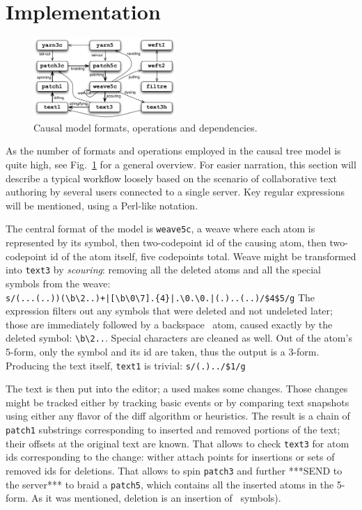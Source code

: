 \documentclass{acm_proc_article-sp}
\begin{document}
\section{Implementation}	   \label{sec:algos}

\begin{figure} \label{fig:ops}
\includegraphics[width=0.48\textwidth]{operations.pdf}
\caption{Causal model formats, operations and dependencies.}
\end{figure}

As the number of formats and operations employed in the
causal tree model is quite high, see Fig.~\ref{fig:ops}
for a general overview.
For easier narration, this section will describe a
typical workflow loosely based on the scenario of 
collaborative text authoring by several users connected
to a single server. Key regular expressions will be
mentioned, using a Perl-like notation.

The central format of the model is {\tt weave5c}, a weave
where each atom is represented by its symbol, then
two-codepoint id of the causing atom, then two-codepoint
id of the atom itself, five codepoints total.
Weave might be transformed into {\tt text3} by 
\emph{scouring}: removing all the deleted atoms and all
the special symbols from the weave: \\
{\small \verb`s/(...(..))(\b\2..)+|[\b\0\7].{4}|.\0.\0.|(.)..(..)/$4$5/g`}
The expression filters out any symbols that were deleted
and not undeleted later; those are immediately followed
by a backspace \bsp ~atom, caused
exactly by the deleted symbol: {\tt \verb+\b\2..+}.
Special characters are cleaned as well.
Out of the atom's 5-form, only the symbol and its id are
taken, thus the output is a 3-form.
Producing the text itself, {\tt text1} is trivial:
{\small \verb`s/(.)../$1/g`}

The text is then put into the editor; a used makes some
changes. Those changes might be tracked either by tracking
basic events or by comparing text snapshots using either
any flavor of the diff algorithm or heuristics.
The result is a chain of {\tt patch1} substrings
corresponding to inserted and removed portions of the text;
their offsets at the original text are known. That allows
to check {\tt text3} for atom ids corresponding to the
change: wither attach points for insertions or sets of
removed ids for deletions. That allows to spin {\tt patch3}
and further ***SEND to the server***
 to braid a {\tt patch5}, which contains all
the inserted atoms in the 5-form. As it was mentioned,
deletion is an insertion of \bsp ~symbols). 
\end{document}
